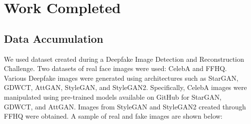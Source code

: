 \chapter{Work Completed}
	\section{Data Accumulation}
		We used dataset created during a Deepfake Image Detection and Reconstruction
		Challenge. Two datasets of real face images were used: CelebA and FFHQ. Various
		Deepfake images were generated using architectures such as StarGAN, GDWCT,
		AttGAN, StyleGAN, and StyleGAN2. Specifically, CelebA images were manipulated
		using pre-trained models available on GitHub for StarGAN, GDWCT, and AttGAN.
		Images from StyleGAN and StyleGAN2 created through FFHQ were obtained. A sample of real and fake images are shown below:

